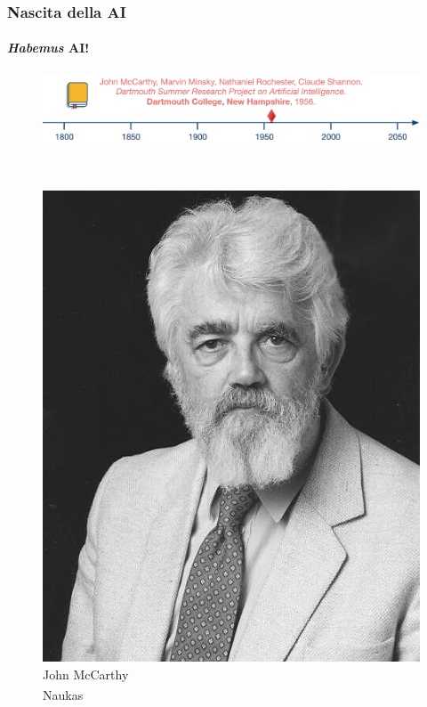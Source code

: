 \begin{frame}[t] \frametitle{Nascita della AI}
{\scriptsize
	\onslide<1->
		\framesubtitle{\textit{Habemus} AI!}
		\vspace*{-.5cm}
		\begin{minipage}[t]{\textwidth}
			\begin{figure}[ht]
				\centering
				\includegraphics[width=\textwidth]{img/AI-timeline-1956-2-alt.png}
			\end{figure}
		\end{minipage}
    \\\vspace*{.3cm}
	\begin{minipage}[t]{\textwidth}
		\begin{minipage}[t]{0.24\textwidth}
			\centering
			\begin{figure}[ht]
				\includegraphics[width=.73\textwidth]{img/John-McCarthy.jpg}
				{\tiny\\John McCarthy\\\textsuperscript{\textcopyright}Naukas}
			\end{figure}
		\end{minipage}

\end{minipage}}
\end{frame}
